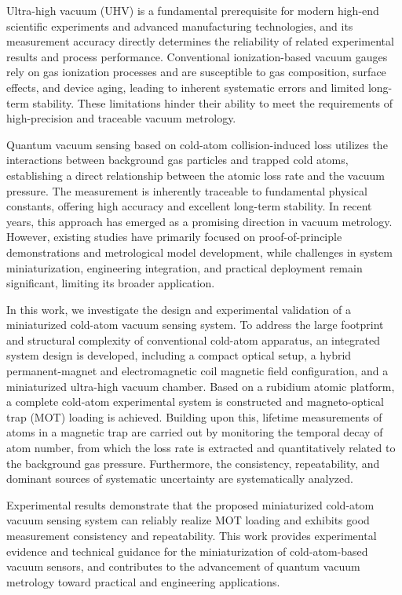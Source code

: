 
Ultra-high vacuum (UHV) is a fundamental prerequisite for modern high-end scientific experiments and advanced manufacturing technologies, and its measurement accuracy directly determines the reliability of related experimental results and process performance. Conventional ionization-based vacuum gauges rely on gas ionization processes and are susceptible to gas composition, surface effects, and device aging, leading to inherent systematic errors and limited long-term stability. These limitations hinder their ability to meet the requirements of high-precision and traceable vacuum metrology. 

Quantum vacuum sensing based on cold-atom collision-induced loss utilizes the interactions between background gas particles and trapped cold atoms, establishing a direct relationship between the atomic loss rate and the vacuum pressure. The measurement is inherently traceable to fundamental physical constants, offering high accuracy and excellent long-term stability. In recent years, this approach has emerged as a promising direction in vacuum metrology. However, existing studies have primarily focused on proof-of-principle demonstrations and metrological model development, while challenges in system miniaturization, engineering integration, and practical deployment remain significant, limiting its broader application.

In this work, we investigate the design and experimental validation of a miniaturized cold-atom vacuum sensing system. To address the large footprint and structural complexity of conventional cold-atom apparatus, an integrated system design is developed, including a compact optical setup, a hybrid permanent-magnet and electromagnetic coil magnetic field configuration, and a miniaturized ultra-high vacuum chamber. Based on a rubidium atomic platform, a complete cold-atom experimental system is constructed and magneto-optical trap (MOT) loading is achieved. Building upon this, lifetime measurements of atoms in a magnetic trap are carried out by monitoring the temporal decay of atom number, from which the loss rate is extracted and quantitatively related to the background gas pressure. Furthermore, the consistency, repeatability, and dominant sources of systematic uncertainty are systematically analyzed.

Experimental results demonstrate that the proposed miniaturized cold-atom vacuum sensing system can reliably realize MOT loading and exhibits good measurement consistency and repeatability. This work provides experimental evidence and technical guidance for the miniaturization of cold-atom-based vacuum sensors, and contributes to the advancement of quantum vacuum metrology toward practical and engineering applications.

